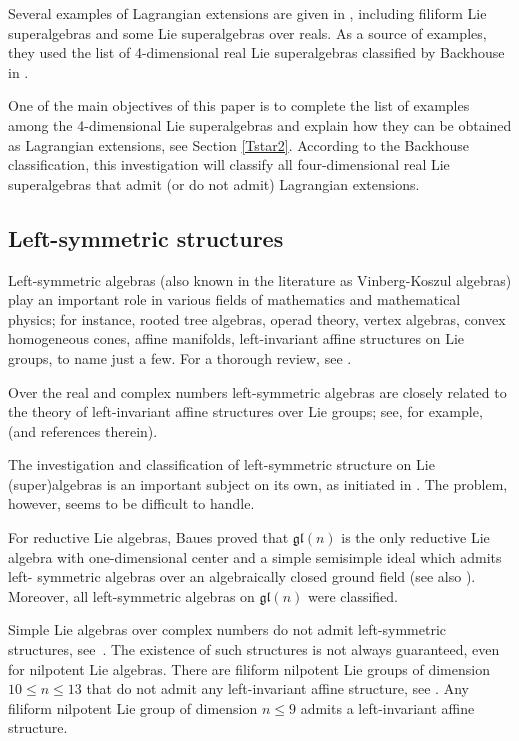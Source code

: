 \documentclass[12pt]{amsart}
\begin{document}
Several examples of Lagrangian extensions are given in \cite{BM}, including filiform Lie superalgebras and some Lie superalgebras over reals. As a source of examples, they used the list of 4-dimensional real Lie superalgebras classified by Backhouse in \cite{B}. 


One of the main objectives of this paper is to complete the list of examples among the 4-dimensional Lie superalgebras and explain how they can be obtained as Lagrangian extensions, see Section \ref{Tstar2}. According to the Backhouse classification, this investigation will classify all four-dimensional real Lie superalgebras that admit (or do not admit) Lagrangian extensions. 

\subsection{Left-symmetric structures} 


Left-symmetric algebras (also known in the literature as Vinberg-Koszul algebras) play an important role in various fields of mathematics and mathematical physics; for instance, rooted tree algebras, operad theory, vertex algebras, convex homogeneous cones, affine manifolds, left-invariant affine structures on Lie groups, to name just a few. For a thorough review, see  \cite{B3}. 

 Over the real and complex numbers
left-symmetric algebras are closely related to the theory of left-invariant affine structures over Lie groups; see, for 
example, \cite{M, GS} (and references therein).

The investigation and classification of left-symmetric structure on Lie (super)algebras is an important subject on its own, as initiated in \cite{S}. The problem, however, seems to be difficult to handle. 


For reductive Lie algebras, Baues \cite{Ba}  proved that $\mathfrak{gl}(n)$ is the only reductive Lie algebra with one-dimensional center and a simple semisimple ideal which admits left- symmetric algebras over an algebraically closed ground field (see also \cite{B1}). Moreover, all left-symmetric algebras on $\mathfrak{gl}(n)$ were classified. 

Simple Lie algebras over complex numbers do not admit left-symmetric structures, see~\cite{H}. The existence of such structures is not always guaranteed, even for nilpotent Lie algebras. There are filiform nilpotent Lie groups of dimension $10 \leq  n \leq 13$ that do not admit any left-invariant affine structure, see \cite{B, B3, BG}. Any filiform nilpotent Lie group of dimension $n \leq 9$ admits a left-invariant affine structure. 
\end{document}
